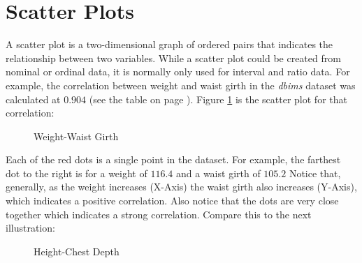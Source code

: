 \section{Scatter Plots}

A scatter plot is a two-dimensional graph of ordered pairs that indicates the relationship between two variables. While a scatter plot could be created from nominal or ordinal data, it is normally only used for interval and ratio data. For example, the correlation between weight and waist girth in the \textit{dbims} dataset was calculated at $ 0.904 $ (see the table on page \pageref{cor:table01}). Figure \ref{cor:weight_waist_scatter_plot} is the scatter plot for that correlation:

\begin{figure}[H]
  \begin{center}
    \caption{Weight-Waist Girth}
    \label{cor:weight_waist_scatter_plot}
  \end{center}
\end{figure}

Each of the red dots is a single point in the dataset. For example, the farthest dot to the right is for a weight of $ 116.4 $ and a waist girth of $ 105.2 $ Notice that, generally, as the weight increases (X-Axis) the waist girth also increases (Y-Axis), which indicates a positive correlation. Also notice that the dots are very close together which indicates a strong correlation. Compare this to the next illustration:

\begin{figure}[H]
  \begin{center}
    \caption{Height-Chest Depth}
    \label{cor:height_chest_scatter_plot}
  \end{center}
\end{figure}

